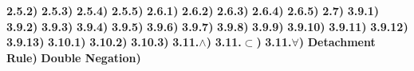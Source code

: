 \documentclass{article}
\begin{document}
{\bf 2.5.2)} 
{\bf 2.5.3)} 
{\bf 2.5.4)} 
\break
{\bf 2.5.5)} 
{\bf 2.6.1)} 
{\bf 2.6.2)} 
\break
{\bf 2.6.3)} 
{\bf 2.6.4)} 
{\bf 2.6.5)} 
{\bf 2.7)} 
{\bf 3.9.1)} 
{\bf 3.9.2)} 
{\bf 3.9.3)} 
{\bf 3.9.4)} 
{\bf 3.9.5)} 
{\bf 3.9.6)} 
{\bf 3.9.7)} 
{\bf 3.9.8)} 
{\bf 3.9.9)} 
{\bf 3.9.10)} 
{\bf 3.9.11)} 
{\bf 3.9.12)} 
{\bf 3.9.13)} 
{\bf 3.10.1)} 
{\bf 3.10.2)} 
{\bf 3.10.3)} 
{\bf 3.11.$\land$)} 
{\bf 3.11.$\subset$)} 
{\bf 3.11.$\forall$)} 
{\bf Detachment Rule)} 
{\bf Double Negation)} 
\end{document}
